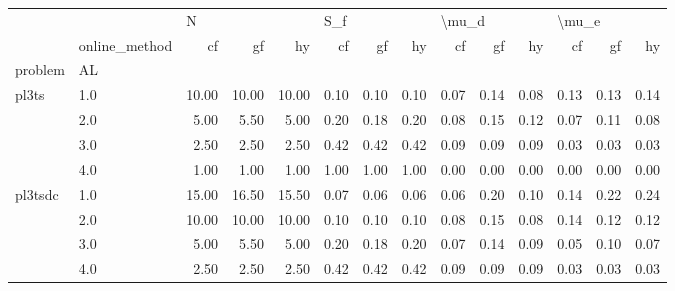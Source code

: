 \begin{tabular}{llrrrrrrrrrrrr}
\toprule
        & {} & \multicolumn{3}{l}{N} & \multicolumn{3}{l}{S\_f} & \multicolumn{3}{l}{\textbackslash mu\_d} & \multicolumn{3}{l}{\textbackslash mu\_e} \\
        & online\_method &    cf &    gf &    hy &   cf &   gf &   hy &    cf &   gf &   hy &    cf &   gf &   hy \\
problem & AL &       &       &       &      &      &      &       &      &      &       &      &      \\
\midrule
pl3ts & 1.0 & 10.00 & 10.00 & 10.00 & 0.10 & 0.10 & 0.10 &  0.07 & 0.14 & 0.08 &  0.13 & 0.13 & 0.14 \\
        & 2.0 &  5.00 &  5.50 &  5.00 & 0.20 & 0.18 & 0.20 &  0.08 & 0.15 & 0.12 &  0.07 & 0.11 & 0.08 \\
        & 3.0 &  2.50 &  2.50 &  2.50 & 0.42 & 0.42 & 0.42 &  0.09 & 0.09 & 0.09 &  0.03 & 0.03 & 0.03 \\
        & 4.0 &  1.00 &  1.00 &  1.00 & 1.00 & 1.00 & 1.00 &  0.00 & 0.00 & 0.00 &  0.00 & 0.00 & 0.00 \\
pl3tsdc & 1.0 & 15.00 & 16.50 & 15.50 & 0.07 & 0.06 & 0.06 &  0.06 & 0.20 & 0.10 &  0.14 & 0.22 & 0.24 \\
        & 2.0 & 10.00 & 10.00 & 10.00 & 0.10 & 0.10 & 0.10 &  0.08 & 0.15 & 0.08 &  0.14 & 0.12 & 0.12 \\
        & 3.0 &  5.00 &  5.50 &  5.00 & 0.20 & 0.18 & 0.20 &  0.07 & 0.14 & 0.09 &  0.05 & 0.10 & 0.07 \\
        & 4.0 &  2.50 &  2.50 &  2.50 & 0.42 & 0.42 & 0.42 &  0.09 & 0.09 & 0.09 &  0.03 & 0.03 & 0.03 \\
\bottomrule
\end{tabular}
